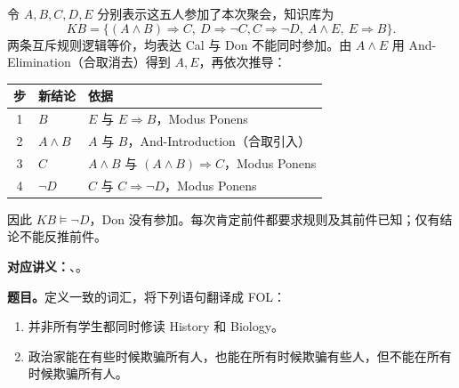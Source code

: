 \begin{checkedsolution}
令 $A,B,C,D,E$ 分别表示这五人参加了本次聚会，知识库为
\[
KB=\{(A\land B)\Rightarrow C,\ D\Rightarrow\neg C,
       C\Rightarrow\neg D,\ A\land E,\ E\Rightarrow B\}.
\]
两条互斥规则逻辑等价，均表达 Cal 与 Don 不能同时参加。由 $A\land E$ 用 And-Elimination（合取消去）得到 $A,E$，再依次推导：
\begin{center}
\begin{tabularx}{\textwidth}{@{}cl>{\raggedright\arraybackslash}X@{}}
\toprule
步 & 新结论 & 依据 \\
\midrule
1 & $B$ & $E$ 与 $E\Rightarrow B$，Modus Ponens \\
2 & $A\land B$ & $A$ 与 $B$，And-Introduction（合取引入） \\
3 & $C$ & $A\land B$ 与 $(A\land B)\Rightarrow C$，Modus Ponens \\
4 & $\neg D$ & $C$ 与 $C\Rightarrow\neg D$，Modus Ponens \\
\bottomrule
\end{tabularx}
\end{center}
因此 $KB\models\neg D$，Don 没有参加。每次肯定前件都要求规则及其前件已知；仅有结论不能反推前件。
\end{checkedsolution}

\textbf{对应讲义：}、。

\textbf{题目。}定义一致的词汇，将下列语句翻译成 FOL：
\begin{enumerate}[label=(\roman*)]
  \item 并非所有学生都同时修读 History 和 Biology。
  \item 政治家能在有些时候欺骗所有人，也能在所有时候欺骗有些人，但不能在所有时候欺骗所有人。
\end{enumerate}


